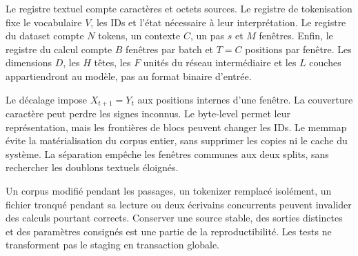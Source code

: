 Le registre textuel compte caractères et octets sources.
Le registre de tokenisation fixe le vocabulaire \(V\), les IDs et l'état
nécessaire à leur interprétation. Le registre du dataset compte \(N\) tokens,
un contexte \(C\), un pas \(s\) et \(M\) fenêtres.
Enfin, le registre du calcul compte \(B\) fenêtres par batch et \(T=C\)
positions par fenêtre. Les dimensions \(D\), les \(H\) têtes, les \(F\)
unités du réseau intermédiaire et les \(L\) couches appartiendront au modèle,
pas au format binaire d'entrée.

Le décalage impose \(X_{t+1}=Y_t\) aux positions internes d'une fenêtre.
La couverture caractère peut perdre les signes inconnus.
Le byte-level permet leur représentation, mais les frontières de blocs
peuvent changer les IDs. Le memmap évite la matérialisation du corpus entier,
sans supprimer les copies ni le cache du système.
La séparation empêche les fenêtres communes aux deux splits,
sans rechercher les doublons textuels éloignés.

Un corpus modifié pendant les passages, un tokenizer remplacé isolément,
un fichier tronqué pendant sa lecture ou deux écrivains concurrents
peuvent invalider des calculs pourtant corrects. Conserver une source stable,
des sorties distinctes et des paramètres consignés est une partie
de la reproductibilité. Les tests ne transforment pas le staging en transaction globale.

